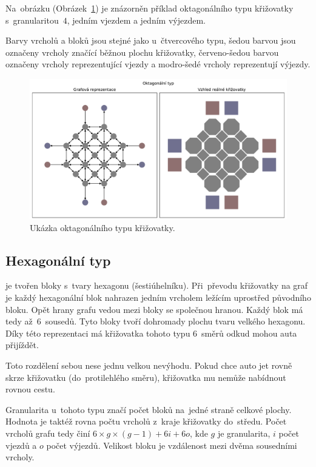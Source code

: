 Na~obrázku (Obrázek~\ref{fig:octagonal_type_graph}) je znázorněn příklad oktagonálního typu křižovatky s~granularitou~$4$,
jedním vjezdem a jedním výjezdem.  %

Barvy vrcholů a bloků jsou stejné jako u~čtvercového typu, šedou barvou jsou označeny vrcholy značící běžnou plochu křižovatky,
červeno-šedou barvou označeny vrcholy reprezentující vjezdy a modro-šedé vrcholy reprezentují výjezdy.

\begin{figure}[h]
  \centering
  \includegraphics[width=\textwidth]{../img/Octagonal_grid}
  \caption{Ukázka oktagonálního typu křižovatky.}
  \label{fig:octagonal_type_graph}
\end{figure}

\subsection{Hexagonální typ}\label{subsec:hexagonalni_typ}

 je tvořen bloky s~tvary hexagonu (šestiúhelníku).
Při~převodu křižovatky na graf je každý hexagonální blok nahrazen jedním vrcholem ležícím uprostřed původního bloku.
Opět hrany grafu vedou mezi bloky se společnou hranou.
Každý blok má tedy až~$6$~sousedů.
Tyto bloky tvoří dohromady plochu tvaru velkého hexagonu.
Díky této reprezentaci má křižovatka tohoto typu $6$~směrů odkud mohou auta přijíždět.

Toto rozdělení sebou nese jednu velkou nevýhodu.
Pokud chce auto jet rovně skrze křižovatku (do~protilehlého směru), křižovatka mu nemůže nabídnout rovnou cestu.

Granularita u~tohoto typu značí počet bloků na~jedné straně celkové plochy.
Hodnota je taktéž rovna počtu vrcholů z~kraje křižovatky do~středu.
Počet vrcholů grafu tedy činí $6 \times g \times (g-1) + 6i + 6o$,
kde $g$ je granularita, $i$ počet vjezdů a $o$ počet výjezdů.
Velikost bloku je vzdálenost mezi dvěma sousedními vrcholy.

